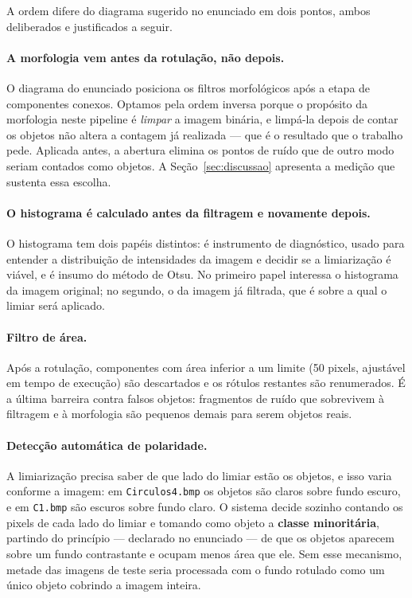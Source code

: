\documentclass[12pt,a4paper]{article}
\begin{document}
\medskip

A ordem difere do diagrama sugerido no enunciado em dois pontos, ambos
deliberados e justificados a seguir.

\paragraph{A morfologia vem antes da rotulação, não depois.} O diagrama do
enunciado posiciona os filtros morfológicos após a etapa de componentes
conexos. Optamos pela ordem inversa porque o propósito da morfologia neste
pipeline é \emph{limpar} a imagem binária, e limpá-la depois de contar os
objetos não altera a contagem já realizada --- que é o resultado que o
trabalho pede. Aplicada antes, a abertura elimina os pontos de ruído que de
outro modo seriam contados como objetos. A Seção~\ref{sec:discussao} apresenta
a medição que sustenta essa escolha.

\paragraph{O histograma é calculado antes da filtragem e novamente depois.}
O histograma tem dois papéis distintos: é instrumento de diagnóstico, usado
para entender a distribuição de intensidades da imagem e decidir se a
limiarização é viável, e é insumo do método de Otsu. No primeiro papel
interessa o histograma da imagem original; no segundo, o da imagem já
filtrada, que é sobre a qual o limiar será aplicado.

\paragraph{Filtro de área.} Após a rotulação, componentes com área inferior a
um limite (50 pixels, ajustável em tempo de execução) são descartados e os
rótulos restantes são renumerados. É a última barreira contra falsos objetos:
fragmentos de ruído que sobrevivem à filtragem e à morfologia são pequenos
demais para serem objetos reais.

\paragraph{Detecção automática de polaridade.} A limiarização precisa saber de
que lado do limiar estão os objetos, e isso varia conforme a imagem: em
\texttt{Circulos4.bmp} os objetos são claros sobre fundo escuro, e em
\texttt{C1.bmp} são escuros sobre fundo claro. O sistema decide sozinho
contando os pixels de cada lado do limiar e tomando como objeto a
\textbf{classe minoritária}, partindo do princípio --- declarado no enunciado
--- de que os objetos aparecem sobre um fundo contrastante e ocupam menos área
que ele. Sem esse mecanismo, metade das imagens de teste seria processada com
o fundo rotulado como um único objeto cobrindo a imagem inteira.
\end{document}
